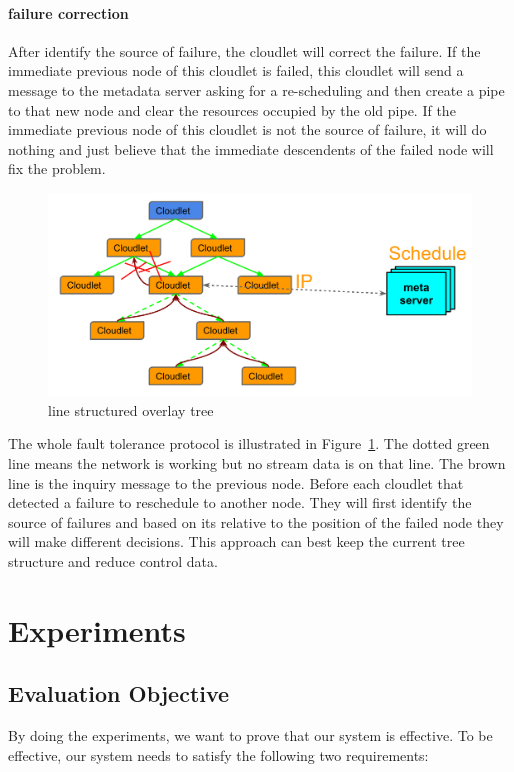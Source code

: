 \documentclass[letterpaper,twocolumn,10pt]{article}
\begin{document}
\paragraph{failure correction}
After identify the source of failure, the cloudlet will correct the failure. If the immediate previous node of this cloudlet is failed, this cloudlet will send a message to the metadata server asking for a re-scheduling and then create a pipe to that new node and clear the resources occupied by the old pipe. If the immediate previous node of this cloudlet is not the source of failure, it will do nothing and just believe that the immediate descendents of the failed node will fix the problem.

\begin{figure}[t]
\begin{center}
\includegraphics[scale=0.3]{pic/fault_tolerance.png}
\end{center}
\caption{line structured overlay tree}
\label{fig:fault_tolerance}
\end{figure}

The whole fault tolerance protocol is illustrated in Figure~\ref{fig:fault_tolerance}. The dotted green line means the network is working but no stream data is on that line. The brown line is the inquiry message to the previous node. Before each cloudlet that detected a failure to reschedule to another node. They will first identify the source of failures and based on its relative to the position of the failed node they will make different decisions. This approach can best keep the current tree structure and reduce control data.

\section{Experiments}
\subsection{Evaluation Objective}
By doing the experiments, we want to prove that our system is effective. To be effective, our system needs to satisfy the following two requirements:
\end{document}
